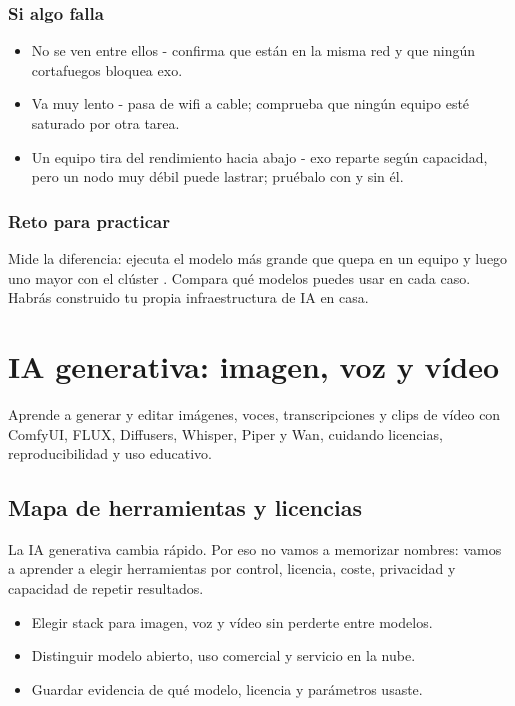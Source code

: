 \documentclass[11pt,a4paper]{book}
\begin{document}
\section{Si algo falla}
\begin{itemize}\item No se ven entre ellos - confirma que están en la misma red y que ningún cortafuegos bloquea exo.\end{itemize}
\begin{itemize}\item Va muy lento - pasa de wifi a cable; comprueba que ningún equipo esté saturado por otra tarea.\end{itemize}
\begin{itemize}\item Un equipo tira del rendimiento hacia abajo - exo reparte según capacidad, pero un nodo muy débil puede lastrar; pruébalo con y sin él.\end{itemize}
\section{Reto para practicar}
Mide la diferencia: ejecuta el modelo más grande que quepa en un equipo y luego uno mayor con el clúster . Compara qué modelos puedes usar en cada caso. Habrás construido tu propia infraestructura de IA en casa.

\part{IA generativa: imagen, voz y vídeo}
Aprende a generar y editar imágenes, voces, transcripciones y clips de vídeo con ComfyUI, FLUX, Diffusers, Whisper, Piper y Wan, cuidando licencias, reproducibilidad y uso educativo.

\chapter{Mapa de herramientas y licencias}
La IA generativa cambia rápido. Por eso no vamos a memorizar nombres: vamos a aprender a elegir herramientas por control, licencia, coste, privacidad y capacidad de repetir resultados.

\begin{itemize}\item Elegir stack para imagen, voz y vídeo sin perderte entre modelos.\end{itemize}
\begin{itemize}\item Distinguir modelo abierto, uso comercial y servicio en la nube.\end{itemize}
\begin{itemize}\item Guardar evidencia de qué modelo, licencia y parámetros usaste.\end{itemize}
\end{document}
